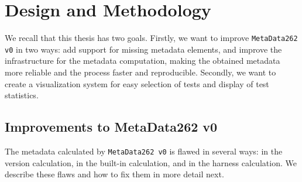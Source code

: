\documentclass[runningheads]{llncs}
\begin{document}
\section{Design and Methodology}
\label{sec:Design and Methodology}



We recall that this thesis has two goals. Firstly, we want to improve \texttt{MetaData262 v0} in two ways: add support for missing metadata elements, and improve the infrastructure for the metadata computation, making the obtained metadata more reliable and the process faster and reproducible. Secondly, we want to create a visualization system for easy selection of tests and display of test statistics.


\subsection{Improvements to MetaData262 v0}
\label{sub:improvements_to_metadata262_v0}


The metadata calculated by \texttt{MetaData262 v0} is flawed in several ways: in the version calculation, in the built-in calculation, and in the harness calculation. We describe these flaws and how to fix them in more detail next.
\end{document}
